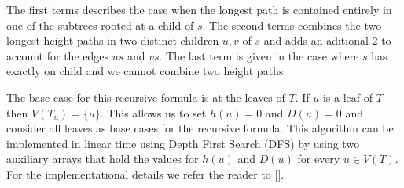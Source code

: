 The first terms describes the case when the longest path is contained entirely in one of the subtrees rooted at a child of $s$. The second terms combines the two longest height paths in two distinct children $u, v$ of $s$ and adds an aditional $2$ to account for the edges $us$ and $vs$. The last term is given in the case where $s$ has exactly on child and we cannot combine two height paths.

The base case for this recursive formula is at the leaves of $T$. If $u$ is a leaf of $T$ then $V(T_u) = \{u\}$. This allows us to set $h(u) = 0$ and $D(u) = 0$ and consider all leaves as base cases for the recursive formula. This algorithm can be implemented in linear time using Depth First Search (DFS) by using two auxiliary arrays that hold the values for $h(u)$ and $D(u)$ for every $u \in V(T)$. For the implementational details we refer the reader to [].


%



